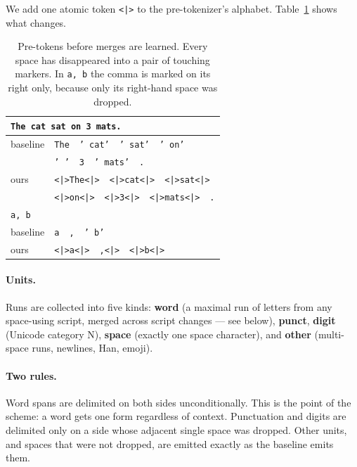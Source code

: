 \documentclass[11pt]{article}
\newcommand{\mk}{\texttt{<|>}}
\begin{document}
We add one atomic token \mk{} to the pre-tokenizer's alphabet. Table~\ref{tab:example} shows
what changes.

\begin{table}[t]
\centering
\small
\begin{tabular}{ll}
\toprule
\multicolumn{2}{l}{\texttt{The cat sat on 3 mats.}} \\
\midrule
baseline & \texttt{The}\ \ \texttt{' cat'}\ \ \texttt{' sat'}\ \ \texttt{' on'} \\
         & \texttt{' '}\ \ \texttt{3}\ \ \texttt{' mats'}\ \ \texttt{.} \\[2pt]
ours     & \texttt{\mk{}The\mk{}}\ \ \texttt{\mk{}cat\mk{}}\ \ \texttt{\mk{}sat\mk{}} \\
         & \texttt{\mk{}on\mk{}}\ \ \texttt{\mk{}3\mk{}}\ \ \texttt{\mk{}mats\mk{}}\ \ \texttt{.} \\
\midrule
\multicolumn{2}{l}{\texttt{a, b}} \\
\midrule
baseline & \texttt{a}\ \ \texttt{,}\ \ \texttt{' b'} \\
ours     & \texttt{\mk{}a\mk{}}\ \ \texttt{,\mk{}}\ \ \texttt{\mk{}b\mk{}} \\
\bottomrule
\end{tabular}
\caption{Pre-tokens before merges are learned. Every space has disappeared into a pair of
touching markers. In \texttt{a, b} the comma is marked on its right only, because only its
right-hand space was dropped.}
\label{tab:example}
\end{table}

\paragraph{Units.} Runs are collected into five kinds: \textbf{word} (a maximal run of
letters from any space-using script, merged across script changes --- see below),
\textbf{punct}, \textbf{digit} (Unicode category N), \textbf{space} (exactly one space
character), and \textbf{other} (multi-space runs, newlines, Han, emoji).

\paragraph{Two rules.} Word spans are delimited on both sides unconditionally. This is the
point of the scheme: a word gets one form regardless of context. Punctuation and digits are
delimited only on a side whose adjacent single space was dropped. Other units, and spaces
that were not dropped, are emitted exactly as the baseline emits them.
\end{document}
